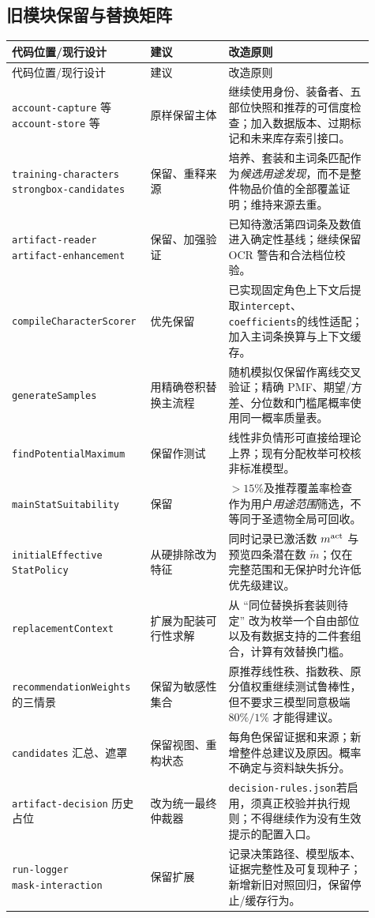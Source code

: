 \documentclass[11pt,a4paper]{ctexart}
\begin{document}
\subsection{旧模块保留与替换矩阵}
\small
\begin{longtable}{p{0.31\linewidth}p{0.21\linewidth}p{0.39\linewidth}}
\toprule
代码位置/现行设计 & 建议 & 改造原则 \\
\midrule
\endfirsthead
\toprule 代码位置/现行设计 & 建议 & 改造原则 \\
\midrule
\endhead
\shortstack[l]{\texttt{account-capture} 等\\\texttt{account-store} 等} & 原样保留主体 & 继续使用身份、装备者、五部位快照和推荐的可信度检查；加入数据版本、过期标记和未来库存索引接口。\\
\shortstack[l]{\texttt{training-characters}\\\texttt{strongbox-candidates}} & 保留、重释来源 & 培养、套装和主词条匹配作为\emph{候选用途发现}，而不是整件物品价值的全部覆盖证明；维持来源去重。\\
\shortstack[l]{\texttt{artifact-reader}\\\texttt{artifact-enhancement}} & 保留、加强验证 & 已知待激活第四词条及数值进入确定性基线；继续保留 OCR 警告和合法档位校验。\\
\texttt{compileCharacterScorer} & 优先保留 & 已实现固定角色上下文后提取\texttt{intercept}、\texttt{coefficients}的线性适配；加入主词条换算与上下文缓存。\\
\texttt{generateSamples} & 用精确卷积替换主流程 & 随机模拟仅保留作离线交叉验证；精确 PMF、期望/方差、分位数和门槛尾概率使用同一概率质量表。\\
\texttt{findPotentialMaximum} & 保留作测试 & 线性非负情形可直接给理论上界；现有分配枚举可校核非标准模型。\\
\texttt{mainStatSuitability} & 保留 & $>15\%$及推荐覆盖率检查作为用户\emph{用途范围}筛选，不等同于圣遗物全局可回收。\\
\shortstack[l]{\texttt{initialEffective}\\\texttt{StatPolicy}} & 从硬排除改为特征 & 同时记录已激活数 $m^{\rm act}$ 与预览四条潜在数 $\widetilde m$；仅在完整范围和无保护时允许低优先级建议。\\
\texttt{replacementContext} & 扩展为配装可行性求解 & 从 ``同位替换拆套装则待定'' 改为枚举一个自由部位以及有数据支持的二件套组合，计算有效替换门槛。\\
\texttt{recommendationWeights} 的三情景 & 保留为敏感性集合 & 原推荐线性秩、指数秩、原分值权重继续测试鲁棒性，但不要求三模型同意极端 $80\%/1\%$ 才能得建议。\\
\texttt{candidates} 汇总、遮罩 & 保留视图、重构状态 & 每角色保留证据和来源；新增整件总建议及原因。概率不确定与资料缺失拆分。\\
\texttt{artifact-decision} 历史占位 & 改为统一最终仲裁器 & \texttt{decision-rules.json}若启用，须真正校验并执行规则；不得继续作为没有生效提示的配置入口。\\
\shortstack[l]{\texttt{run-logger}\\\texttt{mask-interaction}} & 保留扩展 & 记录决策路径、模型版本、证据完整性及可复现种子；新增新旧对照回归，保留停止/缓存行为。\\
\bottomrule
\end{longtable}
\normalsize
\end{document}

